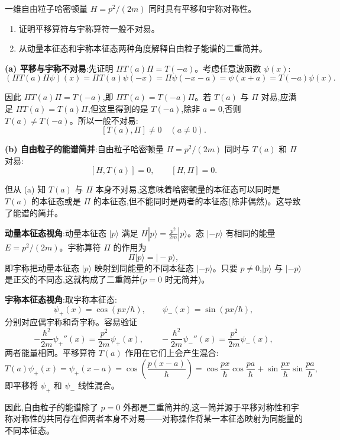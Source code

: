 \begin{question}
一维自由粒子哈密顿量 $H=p^2/(2m)$ 同时具有平移和宇称对称性。
\begin{enumerate}
\item 证明平移算符与宇称算符一般不对易。
\item 从动量本征态和宇称本征态两种角度解释自由粒子能谱的二重简并。
\end{enumerate}
\end{question}
\begin{solution}
	\textbf{(a) 平移与宇称不对易}:先证明 $\Pi T(a)\Pi = T(-a)$。考虑任意波函数 $\psi(x)$:
	\[
	(\Pi T(a)\Pi\psi)(x) = \Pi T(a)\psi(-x) = \Pi\psi(-x-a) = \psi(x+a) = T(-a)\psi(x).
	\]

	因此 $\Pi T(a)\Pi = T(-a)$,即 $\Pi T(a) = T(-a)\Pi$。若 $T(a)$ 与 $\Pi$ 对易,应满足 $\Pi T(a) = T(a)\Pi$,但这里得到的是 $T(-a)$,除非 $a=0$,否则 $T(a)\neq T(-a)$。所以一般不对易:
	\[
	\boxed{[T(a),\Pi]\neq0\quad (a\neq0)}.
	\]

	\textbf{(b) 自由粒子的能谱简并}:自由粒子哈密顿量 $H=p^2/(2m)$ 同时与 $T(a)$ 和 $\Pi$ 对易:
	\[
	[H,T(a)]=0,\qquad [H,\Pi]=0.
	\]

	但从 (a) 知 $T(a)$ 与 $\Pi$ 本身不对易,这意味着哈密顿量的本征态可以同时是 $T(a)$ 的本征态或是 $\Pi$ 的本征态,但不能同时是两者的本征态(除非偶然)。这导致了能谱的简并。

	\textbf{动量本征态视角}:动量本征态 $|p\rangle$ 满足 $H|p\rangle=\frac{p^2}{2m}|p\rangle$。态 $|-p\rangle$ 有相同的能量 $E=p^2/(2m)$。宇称算符 $\Pi$ 的作用为
	\[
	\Pi|p\rangle = |-p\rangle,
	\]
	即宇称把动量本征态 $|p\rangle$ 映射到同能量的不同本征态 $|-p\rangle$。只要 $p\neq0$,$|p\rangle$ 与 $|-p\rangle$ 是正交的不同态,这就构成了二重简并($p=0$ 时无简并)。

	\textbf{宇称本征态视角}:取宇称本征态:
	\[
	\psi_+(x)=\cos(px/\hbar),\qquad \psi_-(x)=\sin(px/\hbar),
	\]
	分别对应偶宇称和奇宇称。容易验证
	\[
	-\frac{\hbar^2}{2m}\psi_+''(x)=\frac{p^2}{2m}\psi_+(x),\qquad
	-\frac{\hbar^2}{2m}\psi_-''(x)=\frac{p^2}{2m}\psi_-(x),
	\]
	两者能量相同。平移算符 $T(a)$ 作用在它们上会产生混合:
	\[
	T(a)\psi_+(x)=\psi_+(x-a)=\cos\left(\frac{p(x-a)}{\hbar}\right)
	=\cos\frac{px}{\hbar}\cos\frac{pa}{\hbar}+\sin\frac{px}{\hbar}\sin\frac{pa}{\hbar},
	\]
	即平移将 $\psi_+$ 和 $\psi_-$ 线性混合。

	因此,自由粒子的能谱除了 $p=0$ 外都是二重简并的,这一简并源于平移对称性和宇称对称性的共同存在但两者本身不对易——对称操作将某一本征态映射为同能量的不同本征态。
	\end{solution}

